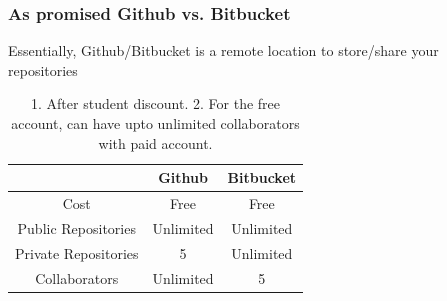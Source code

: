 \documentclass{beamer}
\begin{document}
\begin{frame}
\frametitle{As promised Github vs. Bitbucket}
Essentially, Github/Bitbucket is a remote location to store/share your repositories


\begin{table}
\centering

\begin{tabular}{c|cc}
\hline
 & Github & Bitbucket\\
\hline
Cost & Free & Free\\
Public Repositories & Unlimited & Unlimited\\
Private Repositories & 5\footnote[1] & Unlimited\\
Collaborators & Unlimited & 5\footnote[2] \\
\end{tabular}
\caption{1. After student discount. 2. For the free account, can have upto unlimited collaborators with paid account.}
\end{table}

\end{frame}
\end{document}
